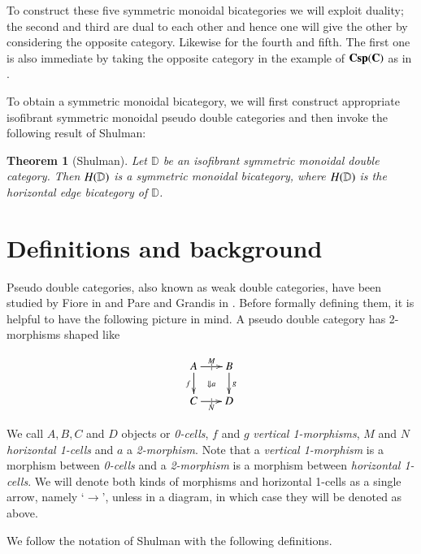 \documentclass[oneside]{amsart}
\newcommand{\lD}{\ensuremath{\mathbb{D}}}
\newtheorem{thm}{Theorem}[section]
\theoremstyle{definition}
\theoremstyle{remark}
\numberwithin{equation}{section}
\begin{document}
To construct these five symmetric monoidal bicategories we will exploit duality; the second and third are dual to each other and hence one will give the other by considering the opposite category. Likewise for the fourth and fifth. The first one is also immediate by taking the opposite category in the example of $\bold{Csp(C)}$ as in \cite{Cour}.

To obtain a symmetric monoidal bicategory, we will first construct appropriate isofibrant symmetric monoidal pseudo double categories and then invoke the following result of Shulman:

\begin{thm}[Shulman]
Let $\lD$ be an isofibrant symmetric monoidal double category. Then $H(\bold{\lD})$ is a symmetric monoidal bicategory, where $H(\bold{\lD})$ is the horizontal edge bicategory of $\lD$.
\end{thm}

\section{Definitions and background}

Pseudo double categories, also known as weak double categories, have been studied by Fiore in \cite{Fiore} and Pare and Grandis in \cite{Gran}. Before formally defining them, it is helpful to have the following picture in mind. A pseudo double category has 2-morphisms shaped like

\begin{equation}\label{eq:square}
  \xymatrix@-.5pc{
    A \ar[r]|{|}^{M}  \ar[d]_f \ar@{}[dr]|{\Downarrow a}&
    B\ar[d]^g\\
    C \ar[r]|{|}_N & D
  }
\end{equation}

We call $A, B, C$ and $D$ objects or \emph{0-cells}, $f$ and $g$ \emph{vertical 1-morphisms}, $M$ and $N$ \emph{horizontal 1-cells} and $a$ a \emph{2-morphism}. Note that a \emph{vertical 1-morphism} is a morphism between \emph{0-cells} and a \emph{2-morphism} is a morphism between \emph{horizontal 1-cells}. We will denote both kinds of morphisms and horizontal 1-cells as a single arrow, namely `$\to$', unless in a diagram, in which case they will be denoted as above.


We follow the notation of Shulman \cite{Shul} with the following definitions.
\end{document}
